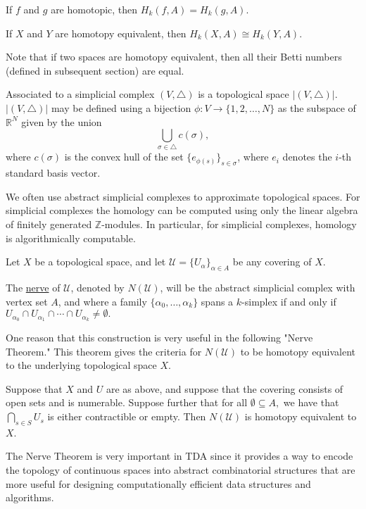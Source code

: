 \begin{thm}
	If $f$ and $g$ are homotopic, then $H_k(f,A) = H_k(g,A).$ 
	
	If $X$ and $Y$ are homotopy equivalent, then $H_k(X,A) \cong H_k(Y,A) $.
	
	Note that if two spaces are homotopy equivalent, then all their Betti numbers (defined in subsequent section) are equal.
\end{thm}
\begin{defn}
    Associated to a simplicial complex $(V, \triangle)$ is a topological space $|(V,\triangle)|$. $|(V,\triangle)|$ may be defined using a bijection $\phi : V \to \{1, 2, \dots,N\}$ as the subspace of $\mathbb{R}^N$ given by the union 
	$$\bigcup_{\sigma \in \triangle} c(\sigma),$$
	where $c(\sigma)$ is the convex hull of the set $\{e_{\phi(s)}\}_{s\in \sigma}$, where $e_i$ denotes the $i$-th standard basis vector.

	 We often use abstract simplicial complexes to approximate topological spaces. For simplicial complexes the homology can be computed using only the linear algebra of finitely generated $\mathbb{Z}$-modules. In particular, for simplicial complexes, homology is algorithmically computable.
\end{defn}	
	
\begin{defn}[Nerve]
	Let $X$ be a topological space, and let $\mathcal{U} = \{U_\alpha\}_{\alpha\in A}$ be any covering of $X$. 
	
	The \underline{nerve} of $\mathcal{U}$, denoted by $N(\mathcal{U})$, will be the abstract simplicial complex with vertex set $A$, and where a family $\{\alpha_0, \dots, \alpha_k\}$ spans a $k$-simplex if and only if $U_{\alpha_0}\cap U_{\alpha_1} \cap \cdots \cap U_{\alpha_k} \neq \emptyset.$
\end{defn}

One reason that this construction is very useful in the following "Nerve Theorem." This theorem gives the criteria for $N(\mathcal{U})$ to be homotopy equivalent to the underlying topological space $X$.

\begin{thm}
Suppose that $X$ and $U$ are as above, and suppose that the covering consists of open sets and is numerable. Suppose further that for all $\emptyset \subseteq A,$ we have that $\bigcap_{s\in S} U_s$ is either contractible or empty. Then $N(\mathcal{U})$ is homotopy equivalent to $X$.
\end{thm}
The Nerve Theorem is very important in TDA since it provides a way to encode the topology of continuous spaces into abstract combinatorial structures that are more useful for designing computationally efficient data structures and algorithms.

